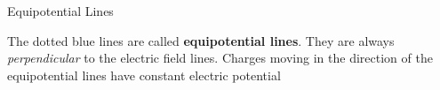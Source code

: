 \documentclass[12pt,aspectratio=169]{beamer}
\begin{document}
\begin{frame}{Equipotential Lines}
  \begin{center}
  \end{center}
  The dotted blue lines are called \textbf{equipotential lines}. They are
  always \emph{perpendicular} to the electric field lines. Charges moving in
  the direction of the equipotential lines have constant electric potential
\end{frame}



%
%
%
%
%
%    
%
%
\end{document}
